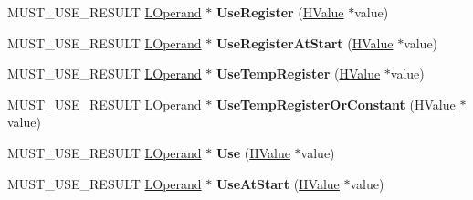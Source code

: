 \begin{DoxyCompactItemize}
\item 
M\+U\+S\+T\+\_\+\+U\+S\+E\+\_\+\+R\+E\+S\+U\+LT \hyperlink{classv8_1_1internal_1_1_l_operand}{L\+Operand} $\ast$ {\bfseries Use\+Register} (\hyperlink{classv8_1_1internal_1_1_h_value}{H\+Value} $\ast$value)\hypertarget{classv8_1_1internal_1_1_l_chunk_builder_a71d4b11b7eca26df2551720af10eeb8d}{}\label{classv8_1_1internal_1_1_l_chunk_builder_a71d4b11b7eca26df2551720af10eeb8d}

\item 
M\+U\+S\+T\+\_\+\+U\+S\+E\+\_\+\+R\+E\+S\+U\+LT \hyperlink{classv8_1_1internal_1_1_l_operand}{L\+Operand} $\ast$ {\bfseries Use\+Register\+At\+Start} (\hyperlink{classv8_1_1internal_1_1_h_value}{H\+Value} $\ast$value)\hypertarget{classv8_1_1internal_1_1_l_chunk_builder_af42aa233d6d4e068d8c2f2b4fa82c4da}{}\label{classv8_1_1internal_1_1_l_chunk_builder_af42aa233d6d4e068d8c2f2b4fa82c4da}

\item 
M\+U\+S\+T\+\_\+\+U\+S\+E\+\_\+\+R\+E\+S\+U\+LT \hyperlink{classv8_1_1internal_1_1_l_operand}{L\+Operand} $\ast$ {\bfseries Use\+Temp\+Register} (\hyperlink{classv8_1_1internal_1_1_h_value}{H\+Value} $\ast$value)\hypertarget{classv8_1_1internal_1_1_l_chunk_builder_a7d84674af68312f8cb3f5926547e239f}{}\label{classv8_1_1internal_1_1_l_chunk_builder_a7d84674af68312f8cb3f5926547e239f}

\item 
M\+U\+S\+T\+\_\+\+U\+S\+E\+\_\+\+R\+E\+S\+U\+LT \hyperlink{classv8_1_1internal_1_1_l_operand}{L\+Operand} $\ast$ {\bfseries Use\+Temp\+Register\+Or\+Constant} (\hyperlink{classv8_1_1internal_1_1_h_value}{H\+Value} $\ast$value)\hypertarget{classv8_1_1internal_1_1_l_chunk_builder_a223c841c9eb44350db394e7868fc0de6}{}\label{classv8_1_1internal_1_1_l_chunk_builder_a223c841c9eb44350db394e7868fc0de6}

\item 
M\+U\+S\+T\+\_\+\+U\+S\+E\+\_\+\+R\+E\+S\+U\+LT \hyperlink{classv8_1_1internal_1_1_l_operand}{L\+Operand} $\ast$ {\bfseries Use} (\hyperlink{classv8_1_1internal_1_1_h_value}{H\+Value} $\ast$value)\hypertarget{classv8_1_1internal_1_1_l_chunk_builder_ac07caab581a6124e19461a131e9be312}{}\label{classv8_1_1internal_1_1_l_chunk_builder_ac07caab581a6124e19461a131e9be312}

\item 
M\+U\+S\+T\+\_\+\+U\+S\+E\+\_\+\+R\+E\+S\+U\+LT \hyperlink{classv8_1_1internal_1_1_l_operand}{L\+Operand} $\ast$ {\bfseries Use\+At\+Start} (\hyperlink{classv8_1_1internal_1_1_h_value}{H\+Value} $\ast$value)\hypertarget{classv8_1_1internal_1_1_l_chunk_builder_a0b5ba53107d18a45201bd6c3812ee7ab}{}\label{classv8_1_1internal_1_1_l_chunk_builder_a0b5ba53107d18a45201bd6c3812ee7ab}


\end{DoxyCompactItemize}
